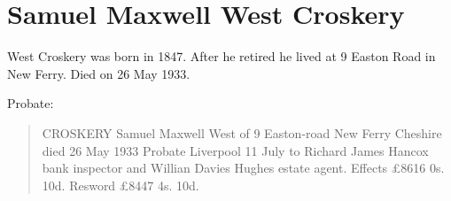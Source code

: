 \section{Samuel Maxwell West Croskery}\label{Samuel_Maxwell_West_Croskery}

West Croskery was born in 1847.
After he retired he lived at 9 Easton Road in New Ferry.
Died on 26 May 1933.\cite{WestCroskeryProbate}

Probate:\cite{WestCroskeryProbate}
\begin{quotation}
CROSKERY Samuel Maxwell West of 9 Easton-road New Ferry Cheshire died 26 May 1933 Probate Liverpool 11 July to Richard James Hancox bank inspector and Willian Davies Hughes estate agent.  Effects \pounds 8616 0s. 10d. Resword \pounds 8447 4s. 10d.
\end{quotation}
